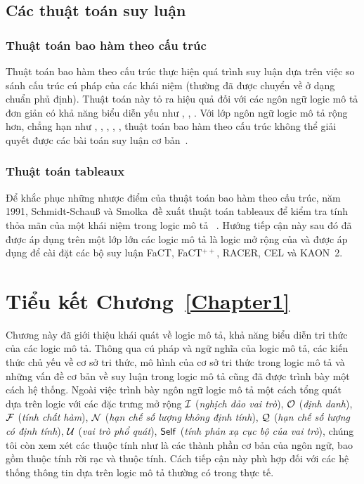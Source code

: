 \subsection{Các thuật toán suy luận}
\label{sec:Chap1.Algorithm}
\subsubsection{Thuật toán bao hàm theo cấu trúc}
\label{sec:Chap1.StructuralSubsumption}
Thuật toán bao hàm theo cấu trúc thực hiện quá trình suy luận dựa trên việc so sánh cấu trúc cú pháp của các khái niệm (thường đã được chuyển về ở dạng chuẩn phủ định). Thuật toán này tỏ ra hiệu quả đối với các ngôn ngữ logic mô tả đơn giản có khả năng biểu diễn yếu như \FLzero, \FLbot, \ALN. Với lớp ngôn ngữ logic mô tả rộng hơn, chẳng hạn như \ALC, \ALCI, \ALCIQ, \SHIQ, \SHOIQ, thuật toán bao hàm theo cấu trúc không thể giải quyết được các bài toán suy luận cơ bản~\cite{DLHandbook2007}.

\subsubsection{Thuật toán tableaux}
\label{sec:Chap1.Tableaux}
Để khắc phục những nhược điểm của thuật toán bao hàm theo cấu trúc, năm 1991, Schmidt-Schau{\ss} và Smolka~đề xuất thuật toán tableaux để kiểm tra tính thỏa mãn của một khái niệm trong logic mô tả \ALC~\cite{Schmidt1991}. Hướng tiếp cận này sau đó đã được áp dụng trên một lớp lớn các logic mô tả là logic mở rộng của \ALC và được áp dụng để cài đặt các bộ suy luận FaCT, FaCT$^{++}$, RACER, CEL và KAON~2.

\section*{Tiểu kết Chương~\ref{Chapter1}}
\label{sec:Chap1.Summary}

Chương này đã giới thiệu khái quát về logic mô tả, khả năng biểu diễn tri thức của các logic mô tả. Thông qua cú pháp và ngữ nghĩa của logic mô tả, các kiến thức chủ yếu về cơ sở tri thức, mô hình của cơ sở tri thức trong logic mô tả và những vấn đề cơ bản về suy luận trong logic mô tả cũng đã được trình bày một cách hệ thống. Ngoài việc trình bày ngôn ngữ logic mô tả một cách tổng quát dựa trên logic \ALCreg với các đặc trưng mở rộng $\mathcal{I}$ ({\em nghịch đảo vai trò}), $\mathcal{O}$ ({\em định danh}), $\mathcal{F}$ ({\em tính chất hàm}), $\mathcal{N}$ ({\em hạn chế số lượng không định tính}), $\mathcal{Q}$ ({\em hạn chế số lượng có định tính}), $\mathcal{U}$ ({\em vai trò phổ quát}), $\mathsf{Self}$ ({\em tính phản xạ cục bộ của vai trò}), chúng tôi còn xem xét các thuộc tính như là các thành phần cơ bản của ngôn ngữ, bao gồm thuộc tính rời rạc và thuộc tính. Cách tiếp cận này phù hợp đối với các hệ thống thông tin dựa trên logic mô tả thường có trong thực tế.
\cleardoublepage